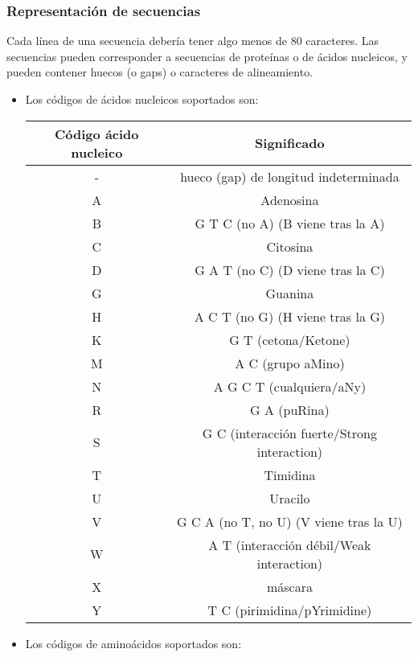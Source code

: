 \documentclass[12pt,a4paper,spanish]{article}
\begin{document}
		\subsubsection{Representación de secuencias}	
			\par Cada línea de una secuencia debería tener algo menos de 80 caracteres. Las secuencias pueden corresponder 				a secuencias de proteínas o de ácidos nucleicos, y pueden contener huecos (o gaps) o caracteres de 				alineamiento.
			 \begin{itemize}
				\item Los códigos de ácidos nucleicos soportados son:
					\begin{center}
						\begin{tabular}{| c | c |}
							\hline
							{\bf Código ácido nucleico} & {\bf Significado} \\
							\hline
							\hline		
							- &	hueco (gap) de longitud indeterminada \\\hline
							A & Adenosina \\\hline
							B &	G T C (no A) (B viene tras la A)	\\\hline 
							C &	Citosina \\\hline
							D &	G A T (no C) (D viene tras la C) \\\hline
							G &	Guanina \\\hline
							H &	A C T (no G) (H viene tras la G) \\\hline
							K &	G T (cetona/Ketone) \\\hline
							M &	A C (grupo aMino) \\\hline
							N &	A G C T (cualquiera/aNy) \\\hline
							R &	G A (puRina) \\\hline
							S &	G C (interacción fuerte/Strong interaction) \\\hline
							T &	Timidina \\\hline
							U &	Uracilo \\\hline
							V &	G C A (no T, no U) (V viene tras la U) \\\hline
							W &	A T (interacción débil/Weak interaction) \\\hline
							X &	máscara \\\hline
							Y &	T C (pirimidina/pYrimidine) \\\hline
						\end{tabular}
					\end{center}	
				\item Los códigos de aminoácidos soportados son:

\end{itemize}
\end{document}

